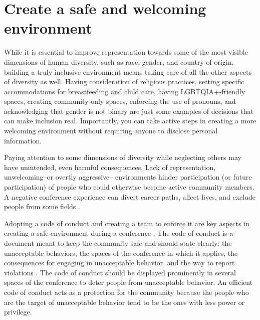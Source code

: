 \documentclass[10pt,letterpaper]{article}
\begin{document}



\section{Create a safe and welcoming environment}
\label{rule_inclusion}

While it is essential to improve representation towards some of the most visible dimensions of human diversity, such as race, gender, and country of origin, building a truly inclusive environment means taking care of all the other aspects of diversity as well. Having consideration of religious practices, setting specific accommodations for breastfeeding and child care, having LGBTQIA+-friendly spaces, creating community-only spaces, enforcing the use of pronouns, and acknowledging that gender is not binary are just some examples of decisions that can make inclusion real.
Importantly, you can take active steps in creating a more welcoming environment without requiring anyone to disclose personal information.

Paying attention to some dimensions of diversity while neglecting others may have unintended, even harmful consequences. Lack of representation, unwelcoming--or overtly aggressive-- environments hinder participation (or future participation) of people who could otherwise become active community members. A negative conference experience can divert career paths, affect lives, and exclude people from some fields \cite{biggsAcademicConferenceChilly2018}. 

Adopting a code of conduct and creating a team to enforce it are key aspects in creating a safe environment during a conference \cite{favaroYourScienceConference2016}.
The code of conduct is a document meant to keep the community safe and should state clearly: the unacceptable behaviors, the spaces of the conference in which it applies, the consequences for engaging in unacceptable behavior, and the way to report violations \cite{auroraHowRespondCode2019}. 
The code of conduct should be displayed prominently in several spaces of the conference to deter people from unacceptable behavior.
An efficient code of conduct acts as a protection for the community because the people who are the target of unacceptable behavior tend to be the ones with less power or privilege.
\end{document}

